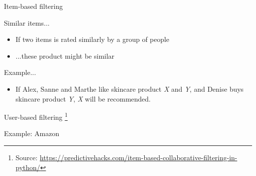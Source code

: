 \documentclass[handout]{beamer}
\begin{document}
\begin{frame}{Item-based filtering}  
	\begin{block}{Similar items...}
		\begin{itemize}
			\item<1->If two items is rated similarly by a group of people
			\item<2->...these product might be similar
		\end{itemize}
	\end{block}
		\begin{exampleblock}{Example...}
			\begin{itemize}
			\item If Alex, Sanne and Marthe like skincare product \textit{X} and \textit{Y}, and Denise buys skincare product  \textit{Y},  \textit{X} will be recommended. 
			\end{itemize}
		\end{exampleblock}
\end{frame}

\begin{frame}{User-based filtering}
	\footnote{Source: \url{https://predictivehacks.com/item-based-collaborative-filtering-in-python/}}
\end{frame}

\begin{frame}{Example: Amazon}
\end{frame}
\end{document}
